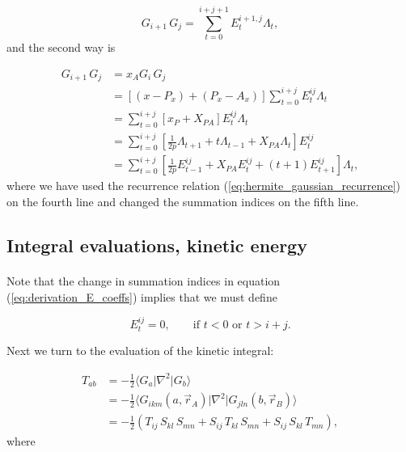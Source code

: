 \documentclass[%
twoside,                 %
final,                   %
10pt]{article}
\begin{document}
\begin{equation}
 G_{i+1}\,G_j= \sum_{t=0}^{i+j+1}E^{i+1,j}_t \Lambda_t,
\end{equation}
and the second way is

\begin{equation}
\label{eq:derivation_E_coeffs}
\begin{split}
 G_{i+1}\,G_j & = x_A G_i\,G_j \\
              & = [(x - P_x) + (P_x - A_x)]\sum_{t=0}^{i+j} E^{ij}_t \Lambda_t\\
              & = \sum_{t=0}^{i+j}[x_P + X_{PA}] E^{ij}_t \Lambda_t \\
              & = \sum_{t=0}^{i+j}[\frac{1}{2p}\Lambda_{t+1} + t\Lambda_{t-1} + X_{PA}\Lambda_t]E^{ij}_t \\
              & = \sum_{t=0}^{i+j}[\frac{1}{2p}E^{ij}_{t-1} + X_{PA}E^{ij}_t + (t+1)E^{ij}_{t+1}] \Lambda_t,
\end{split}
\end{equation}
where we have used the recurrence relation (\ref{eq:hermite_gaussian_recurrence}) on the fourth line and changed the 
summation indices on the fifth line.



\subsection{Integral evaluations, kinetic energy}

\paragraph{}

Note that the change in summation indices in equation (\ref{eq:derivation_E_coeffs}) implies that we must define

\begin{equation}
 E^{ij}_t = 0, \qquad \text{if }t<0\text{ or }t > i + j.
\end{equation}

Next we turn to the evaluation of the kinetic integral:

\begin{equation}
\begin{split}
T_{ab} & = -\frac{1}{2}\langle G_a\vert\nabla^2\vert G_b\rangle \\
       & = -\frac{1}{2}\langle G_{ikm}(a, \vec r_A)\vert\nabla^2\vert G_{jln}(b, \vec r_B)\rangle \\
       & = -\frac{1}{2}(T_{ij}\,S_{kl}\,S_{mn} + S_{ij}\,T_{kl}\,S_{mn} + S_{ij}\,S_{kl}\,T_{mn}),
\end{split}
\end{equation}
where
\end{document}

